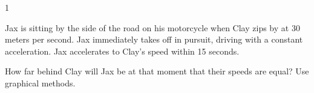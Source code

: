 
\AddToShipoutPicture*{\BackgroundPic}

\addtocounter {ProbNum} {1}

 
{\bf \Large{}} Jax is sitting by the side of the road on his motorcycle when Clay zips by at 30 meters per second.  Jax immediately takes off in pursuit, driving with a constant acceleration.  Jax accelerates to Clay's speed within 15 seconds. \bigskip

How far behind Clay will Jax be at that moment that their speeds are equal?  Use graphical methods. \paragraph{}
\noindent


\vfill
\newpage